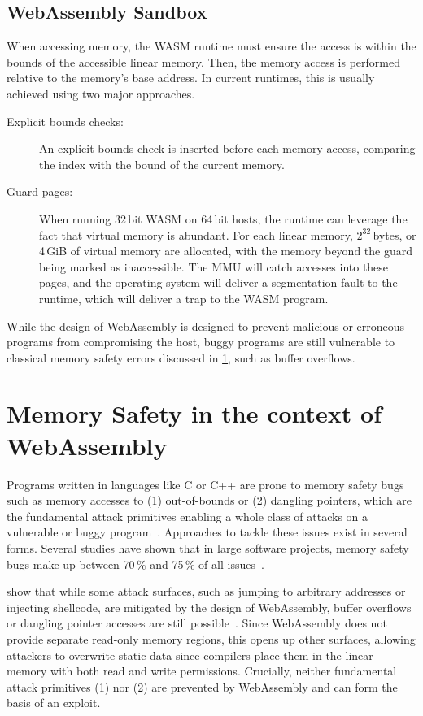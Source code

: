 \subsection{WebAssembly Sandbox}
\label{subsec:webassembly-sandbox}
When accessing memory, the \ac{WASM} runtime must ensure the access is within the bounds of the accessible linear memory.
Then, the memory access is performed relative to the memory's base address.
In current runtimes, this is usually achieved using two major approaches.
\begin{description}
    \item[Explicit bounds checks:] An explicit bounds check is inserted before each memory access, comparing the index with the bound of the current memory.
    \item[Guard pages:] When running 32\,bit \ac{WASM} on 64\,bit hosts, the runtime can leverage the fact that virtual memory is abundant.
    For each linear memory, $2^{32}$\,bytes, or 4\,GiB of virtual memory are allocated, with the memory beyond the guard being marked as inaccessible.
    The \ac{MMU} will catch accesses into these pages, and the operating system will deliver a segmentation fault to the runtime, which will deliver a trap to the \ac{WASM} program.
\end{description}


While the design of WebAssembly is designed to prevent malicious or erroneous programs from compromising the host, buggy programs are still vulnerable to classical memory safety errors discussed in \cref{sec:memory-safety-wasm}, such as buffer overflows.

\section{Memory Safety in the context of WebAssembly}
\label{sec:memory-safety-wasm}

Programs written in languages like C or C++ are prone to memory safety bugs such as memory accesses to (1) out-of-bounds or (2) dangling pointers, which are the fundamental attack primitives enabling a whole class of attacks on a vulnerable or buggy program~\cite{szekeres2013sok}.
Approaches to tackle these issues exist in several forms.
Several studies have shown that in large software projects, memory safety bugs make up between 70\,\% and 75\,\% of all issues~\cite{chromium_memory_safety,microsoft_memory_safety,android_memory_safety}.

\citeauthor*{lehmann2020everything} show that while some attack surfaces, such as jumping to arbitrary addresses or injecting shellcode, are mitigated by the design of WebAssembly, buffer overflows or dangling pointer accesses are still possible~\cite{lehmann2020everything}.
Since WebAssembly does not provide separate read-only memory regions, this opens up other surfaces, allowing attackers to overwrite static data since compilers place them in the linear memory with both read and write permissions.
Crucially, neither fundamental attack primitives (1) nor (2) are prevented by WebAssembly and can form the basis of an exploit.

